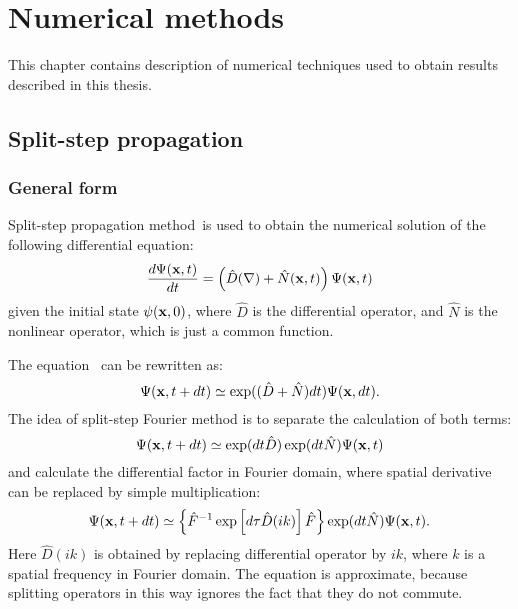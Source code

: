 \chapter{Numerical methods}
\label{cha:appendix:numerical}

This chapter contains description of numerical techniques used to obtain results described in this thesis.

\section{Split-step propagation}


\subsection{General form}

Split-step propagation method~\citationneeded is used to obtain the numerical solution of the following differential equation:
\begin{equation}
\label{eqn:split-step:general-eqn}
    \frac{d\Psi(\mathbf{x}, t)}{dt} = \left(
        \hat{D}(\nabla) + \hat{N}(\mathbf{x}, t)
    \right) \Psi(\mathbf{x}, t)
\end{equation}
given the initial state $\psi(\mathbf{x}, 0)$,
where $\hat{D}$ is the differential operator, and $\hat{N}$ is the nonlinear operator,
which is just a common function.

The equation~ can be rewritten as:
\[
    \Psi(\mathbf{x}, t + dt) \simeq \exp ( ( \hat{D} + \hat{N} ) dt ) \Psi(\mathbf{x}, dt).
\]
The idea of split-step Fourier method is to separate the calculation of both terms:
\begin{equation}
\label{eqn:split-step:split-eqn}
    \Psi(\mathbf{x}, t + dt) \simeq \exp(dt \hat{D}) \exp(dt \hat{N}) \Psi(\mathbf{x}, t)
\end{equation}
and calculate the differential factor in Fourier domain, where spatial derivative can be replaced by simple multiplication:
\[
    \Psi(\mathbf{x}, t + dt) \simeq \left\{
        \hat{F}^{-1} \exp \left[
            d\tau \hat{D}(i k)
        \right] \hat{F}
    \right\}
    \exp(dt \hat{N}) \Psi(\mathbf{x}, t).
\]
Here $\hat{D}(i k)$ is obtained by replacing differential operator by $i k$,
where $k$ is a spatial frequency in Fourier domain.
The equation is approximate, because splitting operators in this way ignores the fact that they do not commute.


